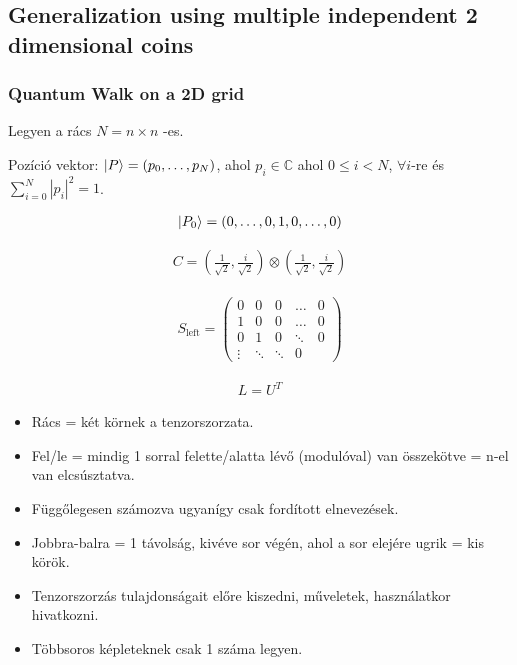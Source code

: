 \subsection{Generalization using multiple independent 2 dimensional coins}

\subsubsection{Quantum Walk on a 2D grid}

Legyen a rács $N = n \times n$ -es.

Pozíció vektor: $\ket{P} =  (p_{0}, \dots, p_{N})$, ahol
$p_{i}\in\mathds{C}$ ahol $0 \leq{} i < N$, $\forall{}i$-re és $\sum\limits_{i=0}^{N} |p_i|^2 = 1$.

\begin{align}
  \ket{P_{0}} =  (0, \dots, 0, 1, 0, \dots, 0)
\end{align}

\begin{align}
  C = (\frac{1}{\sqrt{2}}, \frac{i}{\sqrt{2}}) \otimes (\frac{1}{\sqrt{2}}, \frac{i}{\sqrt{2}})
\end{align}

\begin{align}
  S_{\text{left}} =
  \begin{pmatrix}
    0      & 0      & 0      & \dots  & 0 \\
    1      & 0      & 0      & \dots  & 0 \\
    0      & 1      & 0      & \ddots & 0 \\
    \vdots & \ddots & \ddots & 0
  \end{pmatrix}
\end{align}


\begin{align}
  L = U^{T}
\end{align}


\begin{itemize}
  \item Rács = két körnek a tenzorszorzata.
  \item Fel/le = mindig 1 sorral felette/alatta lévő (modulóval) van összekötve = n-el van elcsúsztatva.
  \item Függőlegesen számozva ugyanígy csak fordított elnevezések.
  \item Jobbra-balra = 1 távolság, kivéve sor végén, ahol a sor elejére ugrik = kis körök.
  \item Tenzorszorzás tulajdonságait előre kiszedni, műveletek, használatkor hivatkozni.
  \item Többsoros képleteknek csak 1 száma legyen.
\end{itemize}

